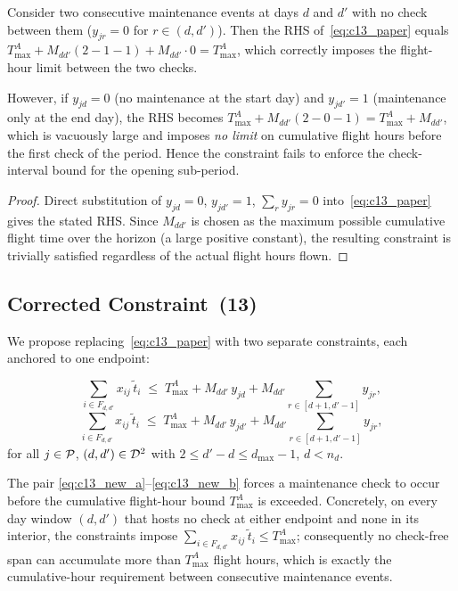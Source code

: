 \begin{lemma}
  \label{lem:c13_flaw}
  Consider two consecutive maintenance events at days $d$ and $d'$ with no
  check between them ($y_{jr} = 0$ for $r \in (d, d')$).  Then the RHS
  of~\eqref{eq:c13_paper} equals $T^A_{\max} + M_{dd'}(2 - 1 - 1) +
  M_{dd'} \cdot 0 = T^A_{\max}$, which correctly imposes the flight-hour
  limit between the two checks.

  However, if $y_{jd} = 0$ (no maintenance at the start day) and $y_{jd'} =
  1$ (maintenance only at the end day), the RHS becomes $T^A_{\max} +
  M_{dd'}(2 - 0 - 1) = T^A_{\max} + M_{dd'}$, which is vacuously large and
  imposes \emph{no limit} on cumulative flight hours before the first check of
  the period.  Hence the constraint fails to enforce the check-interval bound
  for the opening sub-period.
\end{lemma}

\begin{proof}
  Direct substitution of $y_{jd} = 0$, $y_{jd'} = 1$, $\sum_{r} y_{jr} = 0$
  into~\eqref{eq:c13_paper} gives the stated RHS.  Since $M_{dd'}$ is chosen
  as the maximum possible cumulative flight time over the horizon (a large
  positive constant), the resulting constraint is trivially satisfied regardless
  of the actual flight hours flown.
\end{proof}

\subsection{Corrected Constraint~(13)}
\label{subsec:c13_corrected}

We propose replacing~\eqref{eq:c13_paper} with two separate constraints, each
anchored to one endpoint:

\begin{equation}\label{eq:c13_new_a}
  \tag{13a}
  \sum_{i \in F_{d,d'}} x_{ij}\,\tilde{t}_i
  \;\le\;
  T^A_{\max}
  + M_{dd'}\, y_{jd}
  + M_{dd'}\!\sum_{r \in [d+1,d'-1]} y_{jr},
\end{equation}
\begin{equation}\label{eq:c13_new_b}
  \tag{13b}
  \sum_{i \in F_{d,d'}} x_{ij}\,\tilde{t}_i
  \;\le\;
  T^A_{\max}
  + M_{dd'}\, y_{jd'}
  + M_{dd'}\!\sum_{r \in [d+1,d'-1]} y_{jr},
\end{equation}
for all $j \in \mathcal{P}$, $(d,d') \in \mathcal{D}^2$ with $2 \le d'-d \le d_{\max}-1$,
$d < n_d$.

\begin{theorem}
  \label{thm:c13_valid}
  The pair \eqref{eq:c13_new_a}--\eqref{eq:c13_new_b} forces a maintenance
  check to occur before the cumulative flight-hour bound $T^A_{\max}$ is
  exceeded.  Concretely, on every day window $(d,d')$ that hosts no check at
  either endpoint and none in its interior, the constraints impose
  $\sum_{i \in F_{d,d'}} x_{ij}\,\tilde{t}_i \le T^A_{\max}$; consequently no
  check-free span can accumulate more than $T^A_{\max}$ flight hours, which is
  exactly the cumulative-hour requirement between consecutive maintenance
  events.
\end{theorem}

